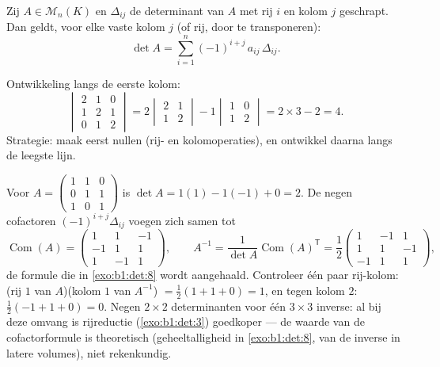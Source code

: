 \begin{theorem}[Cofactorontwikkeling]\label{thm:b1:det:cofactor}
Zij $A \in \mathcal{M}_n(K)$ en $\Delta_{ij}$ de determinant van $A$
met rij $i$ en kolom $j$ geschrapt. Dan geldt, voor elke vaste kolom
$j$ (of rij, door te transponeren):
\[
\det A = \sum_{i=1}^{n} (-1)^{i+j}\, a_{ij}\, \Delta_{ij} .
\]
\end{theorem}
\admitted

\begin{example}\label{ex:b1:det:cofactor}
Ontwikkeling langs de eerste kolom:
\[
\begin{vmatrix}
2 & 1 & 0\\
1 & 2 & 1\\
0 & 1 & 2
\end{vmatrix}
= 2\begin{vmatrix} 2 & 1\\ 1 & 2\end{vmatrix}
- 1\begin{vmatrix} 1 & 0\\ 1 & 2\end{vmatrix}
= 2 \times 3 - 2 = 4 .
\]
Strategie: maak eerst nullen (rij- en kolomoperaties), en ontwikkel
daarna langs de leegste lijn.
\end{example}

\begin{example}
\label{ex:b1:det:cofactorinverse}
Voor $A = \begin{pmatrix} 1 & 1 & 0\\ 0 & 1 & 1\\ 1 & 0 &
1\end{pmatrix}$ is $\det A = 1(1) - 1(-1) + 0 = 2$. De negen
cofactoren $(-1)^{i+j}\Delta_{ij}$ voegen zich samen tot
\[
\operatorname{Com}(A) = \begin{pmatrix}
1 & 1 & -1\\
-1 & 1 & 1\\
1 & -1 & 1
\end{pmatrix},
\qquad
A^{-1} = \frac{1}{\det A}\operatorname{Com}(A)^{\mathsf T}
= \frac12\begin{pmatrix}
1 & -1 & 1\\
1 & 1 & -1\\
-1 & 1 & 1
\end{pmatrix},
\]
de formule die in \cref{exo:b1:det:8} wordt aangehaald. Controleer
één paar rij-kolom: (rij $1$ van $A$)(kolom $1$ van $A^{-1}$) $=
\frac12(1 + 1 + 0) = 1$, en tegen kolom $2$: $\frac12(-1 + 1 + 0)
= 0$. Negen $2\times2$ determinanten voor één $3\times3$ inverse:
al bij deze omvang is rijreductie (\cref{exo:b1:det:3})
goedkoper --- de waarde van de cofactorformule is theoretisch
(geheeltalligheid in \cref{exo:b1:det:8},  van de
inverse in latere volumes), niet rekenkundig.
\end{example}

